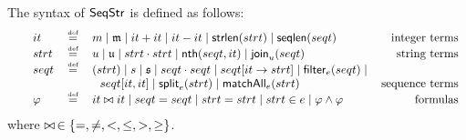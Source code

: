 The syntax of ${\sf SeqStr}$ is defined as follows:
\[
\begin{tabular}{c l l l r}
	$~$ &	$it$      & $ \eqdef $ & $m \mid \svarm \mid it+it \mid it-it \mid \mystrlen(strt)\mid \myseqlen(seqt) $                                                      & integer terms  \\
		&	$strt$    & $ \eqdef $ & $u \mid \svaru \mid strt \concat strt \mid \myat(seqt, it) \mid \myjoin_u(seqt)    $                      & string terms   \\
		&	$seqt$    & $ \eqdef $ & $(strt) \mid s \mid \svars \mid seqt \concat seqt \mid seqt[it \rightarrow strt] \mid  \myfilter_e(seqt) \mid  $ &                \\
			&          &            & $\ \ seqt[it, it]  \mid \mysplit_e(strt) \mid \mymatchall_e(strt) $                              & sequence terms \\
		&	$\varphi$ & $ \eqdef $ & $ it \iop it  \mid seqt = seqt \mid strt = strt \mid strt \in e  \mid \varphi \wedge \varphi $                   & formulas
	\end{tabular}
    \]
where  $\bowtie\, \in \{=, \neq, <, \le, >, \ge\}$.
%

